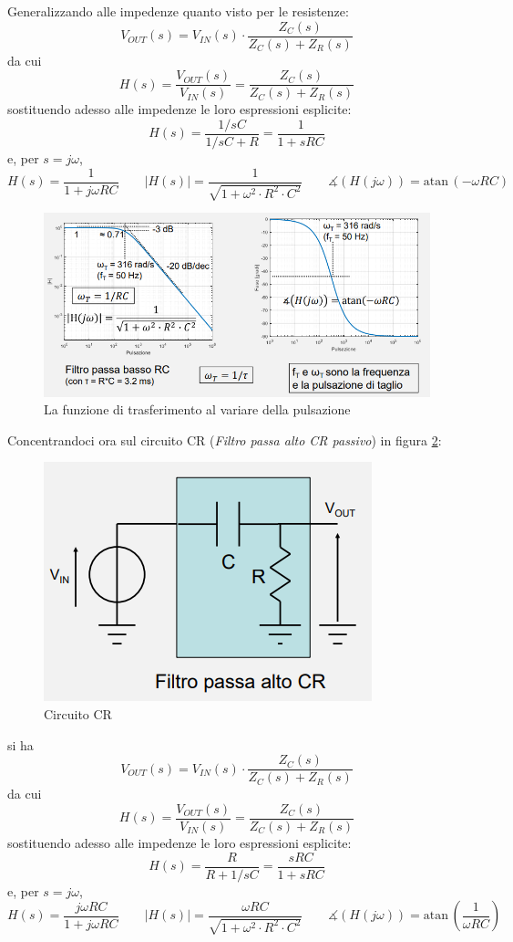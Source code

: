 \documentclass{article}
\begin{document}
Generalizzando alle impedenze quanto visto per le resistenze:
\[V_{OUT}(s) = V_{IN}(s) \cdot \frac{Z_C(s)}{Z_C(s) + Z_R(s)}\]
da cui 
\[H(s) = \frac{V_{OUT} (s)}{V_{IN} (s)} = \frac{Z_C(s)}{Z_C(s) + Z_R(s)}\]
sostituendo adesso alle impedenze le loro espressioni esplicite:
\[H(s) = \frac{1/sC}{1/sC + R} = \frac{1}{1 + sRC}\]
e, per $s = j\omega$, 
\[H(s) = \frac{1}{1 + j \omega RC} \quad \quad |H(s)| = \frac{1}{\sqrt{1 + \omega ^2 \cdot R^2 \cdot C^2}} \quad \quad \measuredangle (H(j \omega)) = \textrm{atan}\, (- \omega RC)\]
\begin{figure}[h]
  \centering
  \includegraphics[scale=0.6]{IM_circuito_RC_passivo_grafici}
  \caption{La funzione di trasferimento al variare della pulsazione}
  \label{Schema_circuito_RC_passivo_grafici}
\end{figure}
\clearpage
Concentrandoci ora sul circuito CR (\textit{Filtro passa alto CR passivo}) in figura \ref{Schema_circuito_CR_passivo}:

\begin{figure}[h]
  \centering
  \includegraphics[scale=0.6]{IM_circuito_CR_passivo}
  \caption{Circuito CR}
  \label{Schema_circuito_CR_passivo}
\end{figure}
si ha
\[V_{OUT}(s) = V_{IN}(s) \cdot \frac{Z_C(s)}{Z_C(s) + Z_R(s)}\]
da cui 
\[H(s) = \frac{V_{OUT} (s)}{V_{IN} (s)} = \frac{Z_C(s)}{Z_C(s) + Z_R(s)}\]
sostituendo adesso alle impedenze le loro espressioni esplicite:
\[H(s) = \frac{R}{R + 1/sC} = \frac{sRC}{1 + sRC}\]
e, per $s = j\omega$, 
\[H(s) = \frac{j \omega RC}{1 + j \omega RC} \quad \quad |H(s)| = \frac{\omega RC}{\sqrt{1 + \omega ^2 \cdot R^2 \cdot C^2}} \quad \quad \measuredangle (H(j \omega)) = \textrm{atan}\, \left(\frac{1}{\omega RC}\right)\]
\end{document}
